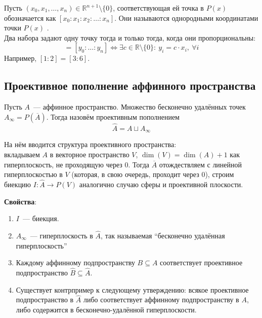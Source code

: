 \documentclass[11pt]{article}
\begin{document}
    Пусть $(x_0, x_1, \hdots, x_n) \in \mathbb{R}^{n+1} \setminus \{0\}$, соответствующая ей точка в $P(x)$ обозначается как $[x_0 : x_1 : x_2 : \hdots : x_n]$. Они называются однородными координатами точки $P(x)$
. \\

    Два набора задают одну точку тогда и только тогда, когда они пропорциональны:
    \begin{equation*}
        [x_0 : \hdots : x_n] = [y_0 : \hdots : y_n] \Longleftrightarrow \exists c \in \mathbb{R} \setminus \{0\}: \ y_i = c \cdot x_i, \ \forall i
    \end{equation*}
    Например, $[1 : 2] = [3 : 6]$.

    \subsection{Проективное пополнение аффинного пространства}

    \begin{definition}
        Пусть $A$~--- аффинное пространство. Множество бесконечно удалённых точек $A_{\infty} = P(\overline{A})$. Тогда назовём проективным пополнением
        \begin{equation*}
            \hat{A} = A \sqcup A_{\infty}
        \end{equation*}
    \end{definition}

    На нём вводится структура проективного пространства: \\
    вкладываем $A$ в векторное пространство  $V$, $\dim(V) = \dim(A) + 1$ как гиперплоскость, не проходящую через $0$. Тогда $\overline{A}$ отождествляем с линейной гиперплоскостью в $V$ (которая, в свою очередь, проходит через $0$), строим биекцию $I: \hat{A} \to P(V)$ аналогично случаю сферы и проективной плоскости.

    \textbf{Свойства}:
    \begin{enumerate}
        \item $I$~--- биекция.
        \item $A_{\infty}$~--- гиперплоскость в $\hat{A}$, так называемая ``бесконечно удалённая гиперплоскость''
        \item Каждому аффинному подпространству $B \subseteq A$ соответствует проективное подпространство $\hat{B} \subseteq \hat{A}$.
        \item Существует контрпример к следующему утверждению: всякое проективное подпространство в $\hat{A}$ либо соответствует аффинному подпространству в $A$, либо содержится в бесконечно-удалённой гиперплоскости.
    \end{enumerate}
\end{document}
